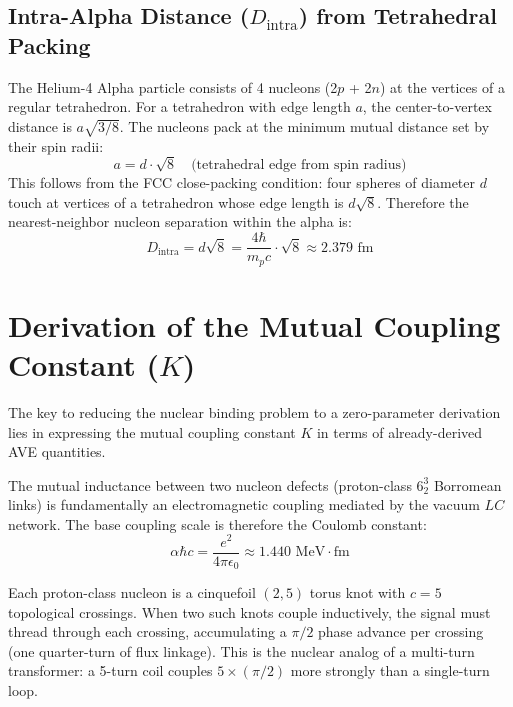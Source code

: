 \subsection{Intra-Alpha Distance ($D_{\text{intra}}$) from Tetrahedral Packing}

The Helium-4 Alpha particle consists of 4 nucleons (2$p$ + 2$n$) at the vertices of a regular tetrahedron. For a tetrahedron with edge length $a$, the center-to-vertex distance is $a\sqrt{3/8}$. The nucleons pack at the minimum mutual distance set by their spin radii:
\begin{equation}
    a = d \cdot \sqrt{8}
    \quad\text{(tetrahedral edge from spin radius)}
\end{equation}
This follows from the FCC close-packing condition: four spheres of diameter $d$ touch at vertices of a tetrahedron whose edge length is $d\sqrt{8}$. Therefore the nearest-neighbor nucleon separation within the alpha is:
\begin{equation}
    \boxed{D_{\text{intra}} = d\sqrt{8} = \frac{4\hbar}{m_p c} \cdot \sqrt{8} \approx 2.379 \text{ fm}}
    \label{eq:d_intra}
\end{equation}

\section{Derivation of the Mutual Coupling Constant ($K$)}
\label{sec:K_derivation}
The key to reducing the nuclear binding problem to a zero-parameter derivation lies in expressing the mutual coupling constant $K$ in terms of already-derived AVE quantities.

The mutual inductance between two nucleon defects (proton-class $6^3_2$ Borromean links) is fundamentally an electromagnetic coupling mediated by the vacuum $LC$ network. The base coupling scale is therefore the Coulomb constant:
\begin{equation}
    \alpha \hbar c = \frac{e^2}{4\pi\epsilon_0} \approx 1.440 \text{ MeV}\cdot\text{fm}
\end{equation}

Each proton-class nucleon is a cinquefoil $(2,5)$ torus knot with $c = 5$ topological crossings. When two such knots couple inductively, the signal must thread through each crossing, accumulating a $\pi/2$ phase advance per crossing (one quarter-turn of flux linkage). This is the nuclear analog of a multi-turn transformer: a 5-turn coil couples $5 \times (\pi/2)$ more strongly than a single-turn loop.

